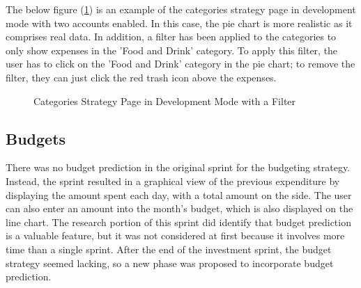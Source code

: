 The below figure (\ref{fig:CategoriesStrategyDevelopment}) is an example of the categories strategy page in development mode with two accounts enabled. In this case, the pie chart is more realistic as it comprises real data. In addition, a filter has been applied to the categories to only show expenses in the 'Food and Drink' category. To apply this filter, the user has to click on the 'Food and Drink' category in the pie chart; to remove the filter, they can just click the red trash icon above the expenses.

\begin{figure}[H]
	\centering
	\caption{Categories Strategy Page in Development Mode with a Filter}
	\label{fig:CategoriesStrategyDevelopment}
\end{figure}

\subsection{Budgets}
\label{sec:budgets}
There was no budget prediction in the original sprint for the budgeting strategy. Instead, the sprint resulted in a graphical view of the previous expenditure by displaying the amount spent each day, with a total amount on the side. The user can also enter an amount into the month's budget, which is also displayed on the line chart. The research portion of this sprint did identify that budget prediction is a valuable feature, but it was not considered at first because it involves more time than a single sprint. After the end of the investment sprint, the budget strategy seemed lacking, so a new phase was proposed to incorporate budget prediction.

